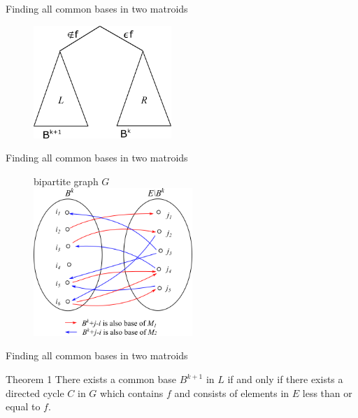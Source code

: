 \documentclass[11pt,xcolor=dvipsnames,table,dvipdfmx]{beamer}
\begin{document}
\begin{frame}{Finding all common bases in two matroids}
 \begin{figure}
  \centering
  \includegraphics[width=5.2cm]{text4989-7.png}
 \end{figure}
\end{frame}

\begin{frame}{Finding all common bases in two matroids}
 \begin{figure}
  bipartite graph $G$\vspace{1cm}\\
  \centering
  \includegraphics[width=6cm]{text8631-16-2-7.png}
 \end{figure}
\end{frame}

\begin{frame}{Finding all common bases in two matroids}
 \begin{block}{Theorem 1}
  There exists a common base $B^{k+1}$ in $L$ if and only if there exists a directed cycle $C$ in $G$ which contains $f$ and consists of elements in $E$ less than or equal to $f$.
 \end{block}
\end{frame}
\end{document}
